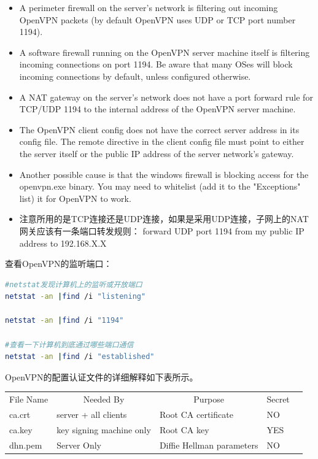 \documentclass{book}
\begin{document}
\begin{itemize}
\item{A perimeter firewall on the server's network is filtering out incoming OpenVPN packets (by default OpenVPN uses UDP or TCP port number 1194).}
\item{A software firewall running on the OpenVPN server machine itself is filtering incoming connections on port 1194. Be aware that many OSes will block incoming connections by default, unless configured otherwise.}
\item{A NAT gateway on the server's network does not have a port forward rule for TCP/UDP 1194 to the internal address of the OpenVPN server machine.}
\item{The OpenVPN client config does not have the correct server address in its config file. The remote directive in the client config file must point to either the server itself or the public IP address of the server network's gateway.}
\item{Another possible cause is that the windows firewall is blocking access for the openvpn.exe binary. You may need to whitelist (add it to the "Exceptions" list) it for OpenVPN to work.}
\item{注意所用的是TCP连接还是UDP连接，如果是采用UDP连接，子网上的NAT网关应该有一条端口转发规则： forward UDP port 1194 from my public IP address to 192.168.X.X}
\end{itemize}

查看OpenVPN的监听端口：

\begin{lstlisting}[language=Bash]
#netstat发现计算机上的监听或开放端口
netstat -an |find /i "listening"

netstat -an |find /i "1194"

#查看一下计算机到底通过哪些端口通信
netstat -an |find /i "established"
\end{lstlisting}

OpenVPN的配置认证文件的详细解释如下表所示。

\begin{tabular}{|l|l|l|l|l|}
	\hline
	\multirow{1}{*}{File Name}
	& \multicolumn{1}{c|}{Needed By}
	& \multicolumn{1}{c|}{Purpose}
	& \multicolumn{1}{c|}{Secret}\\
	\cline{1-4}
	ca.crt & server + all clients & Root CA certificate & NO \\
	\hline
	ca.key & key signing machine only & Root CA key & YES\\
	\hline
	dh{n}.pem & Server Only & Diffie Hellman parameters & NO\\
	\hline						
\end{tabular}
\end{document}
